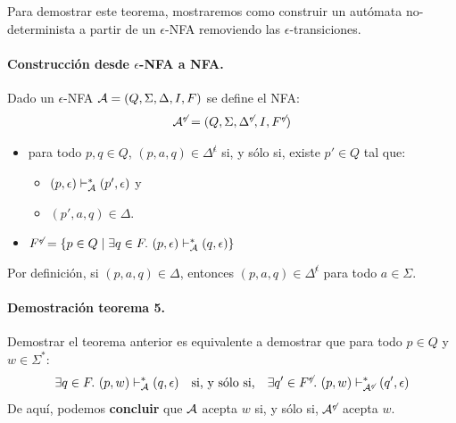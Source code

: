 
Para demostrar este teorema, mostraremos como construir un autómata no-determinista a partir de un $\epsilon$-NFA removiendo las $\epsilon$-transiciones.

\paragraph{Construcción desde $\epsilon$-NFA a NFA.} Dado un $\epsilon$-NFA $\mathcal{A} = (Q, \Sigma, \Delta, I, F)$ se define el NFA:
$$
    \mathcal{A}^{\not\epsilon} =  (Q, \Sigma, \Delta^{\not\epsilon}, I, F^{\not\epsilon})
$$
\begin{multicols}{2}
    \begin{itemize}
        \item para todo $p,q \in Q$, $(p,a,q) \in \Delta^{\not\epsilon}$ si, y sólo si, existe $p' \in Q$ tal que:
              \begin{itemize}
                  \item $(p,\epsilon) \vdash_{\mathcal{A}}^* (p', \epsilon)$ y
                  \item $(p', a, q) \in \Delta$.
              \end{itemize}
        \item $F^{\not\epsilon} = \{ p \in Q \mid \exists q \in F.\ (p, \epsilon) \vdash_{\mathcal{A}}^* (q, \epsilon)\}$
    \end{itemize}
\end{multicols}
Por definición, si $(p, a, q) \in \Delta$, entonces $(p, a, q) \in \Delta^{\not\epsilon}$ para todo $a \in \Sigma$.

\paragraph{Demostración teorema 5.} Demostrar el teorema anterior es equivalente a demostrar que para todo $p \in Q$ y $w \in \Sigma^*$:
$$
    \exists q \in F.\ (p,w) \vdash_{\mathcal{A}}^* (q, \epsilon) \quad \text{si, y sólo si,} \quad \exists q' \in F^{\not\epsilon}.\ (p, w) \vdash_{\mathcal{A}^{\not\epsilon}}^* (q', \epsilon)
$$
De aquí, podemos \textbf{concluir} que $\mathcal{A}$ acepta $w$ si, y sólo si, $\mathcal{A}^{\not\epsilon}$ acepta $w$. \medbreak

